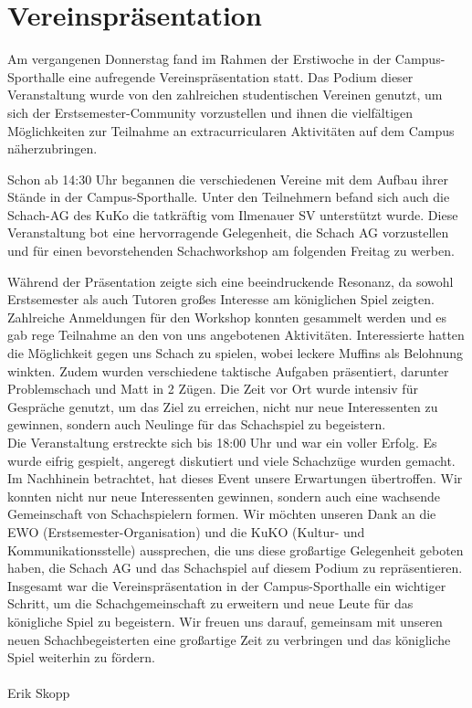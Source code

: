 \documentclass[a4paper,ngerman]{tui-algo-seminar}
\title{\inhalt}
\author{Erik Skopp}
\begin{document}
\maketitle
\thispagestyle{plain} %
\begin{abstract}
Bericht über die Vereinspräsentation des Ilmenauer SV's im Rahmen der Erstiwoche des Wintersemesters 2023 / 2024.
\end{abstract}

\section{Vereinspräsentation}
Am vergangenen Donnerstag fand im Rahmen der Erstiwoche in der Campus-Sporthalle eine aufregende Vereinspräsentation statt. Das Podium dieser Veranstaltung wurde von den zahlreichen studentischen Vereinen genutzt, um sich der Erstsemester-Community vorzustellen und ihnen die vielfältigen Möglichkeiten zur Teilnahme an extracurricularen Aktivitäten auf dem Campus näherzubringen.

Schon ab 14:30 Uhr begannen die verschiedenen Vereine mit dem Aufbau ihrer Stände in der Campus-Sporthalle. Unter den Teilnehmern befand sich auch die Schach-AG des KuKo die tatkräftig vom Ilmenauer SV unterstützt wurde. Diese Veranstaltung bot eine hervorragende Gelegenheit, die Schach AG vorzustellen und für einen bevorstehenden Schachworkshop am folgenden Freitag zu werben.

Während der Präsentation zeigte sich eine beeindruckende Resonanz, da sowohl Erstsemester als auch Tutoren großes Interesse am königlichen Spiel zeigten. Zahlreiche Anmeldungen für den Workshop konnten gesammelt werden und es gab rege Teilnahme an den von uns angebotenen Aktivitäten. Interessierte hatten die Möglichkeit gegen uns Schach zu spielen, wobei leckere Muffins als Belohnung winkten. Zudem wurden verschiedene taktische Aufgaben präsentiert, darunter Problemschach und Matt in 2 Zügen. Die Zeit vor Ort wurde intensiv für Gespräche genutzt, um das Ziel zu erreichen, nicht nur neue Interessenten zu gewinnen, sondern auch Neulinge für das Schachspiel zu begeistern.\\
Die Veranstaltung erstreckte sich bis 18:00 Uhr und war ein voller Erfolg. Es wurde eifrig gespielt, angeregt diskutiert und viele Schachzüge wurden gemacht. Im Nachhinein betrachtet, hat dieses Event unsere Erwartungen übertroffen. Wir konnten nicht nur neue Interessenten gewinnen, sondern auch eine wachsende Gemeinschaft von Schachspielern formen. Wir möchten unseren Dank an die EWO (Erstsemester-Organisation) und die KuKO (Kultur- und Kommunikationsstelle) aussprechen, die uns diese großartige Gelegenheit geboten haben, die Schach AG und das Schachspiel auf diesem Podium zu repräsentieren.\\
Insgesamt war die Vereinspräsentation in der Campus-Sporthalle ein wichtiger Schritt, um die Schachgemeinschaft zu erweitern und neue Leute für das königliche Spiel zu begeistern. Wir freuen uns darauf, gemeinsam mit unseren neuen Schachbegeisterten eine großartige Zeit zu verbringen und das königliche Spiel weiterhin zu fördern.\\
\\
Erik Skopp
\end{document}

